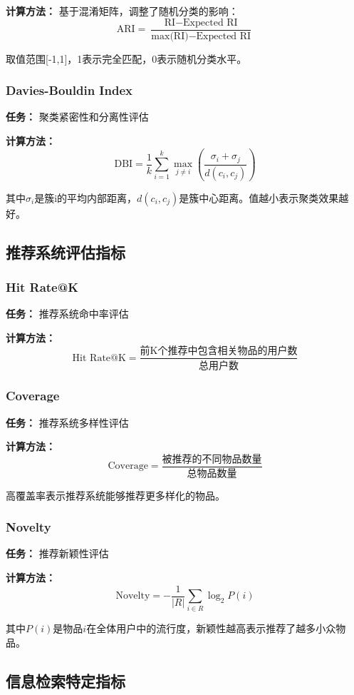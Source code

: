 \documentclass[a4paper]{article}
\begin{document}
\textbf{计算方法：} 基于混淆矩阵，调整了随机分类的影响：
$$\text{ARI} = \frac{\text{RI} - \text{Expected RI}}{\text{max(RI)} - \text{Expected RI}}$$

取值范围[-1,1]，1表示完全匹配，0表示随机分类水平。

\subsubsection{Davies-Bouldin Index}
\textbf{任务：} 聚类紧密性和分离性评估

\textbf{计算方法：}
$$\text{DBI} = \frac{1}{k}\sum_{i=1}^{k}\max_{j \neq i}\left(\frac{\sigma_i + \sigma_j}{d(c_i, c_j)}\right)$$

其中$\sigma_i$是簇i的平均内部距离，$d(c_i, c_j)$是簇中心距离。值越小表示聚类效果越好。

\subsection{推荐系统评估指标}

\subsubsection{Hit Rate@K}
\textbf{任务：} 推荐系统命中率评估

\textbf{计算方法：}
$$\text{Hit Rate@K} = \frac{\text{前K个推荐中包含相关物品的用户数}}{\text{总用户数}}$$

\subsubsection{Coverage}
\textbf{任务：} 推荐系统多样性评估

\textbf{计算方法：}
$$\text{Coverage} = \frac{\text{被推荐的不同物品数量}}{\text{总物品数量}}$$

高覆盖率表示推荐系统能够推荐更多样化的物品。

\subsubsection{Novelty}
\textbf{任务：} 推荐新颖性评估

\textbf{计算方法：}
$$\text{Novelty} = -\frac{1}{|R|}\sum_{i \in R}\log_2 P(i)$$

其中$P(i)$是物品$i$在全体用户中的流行度，新颖性越高表示推荐了越多小众物品。

\subsection{信息检索特定指标}
\end{document}
